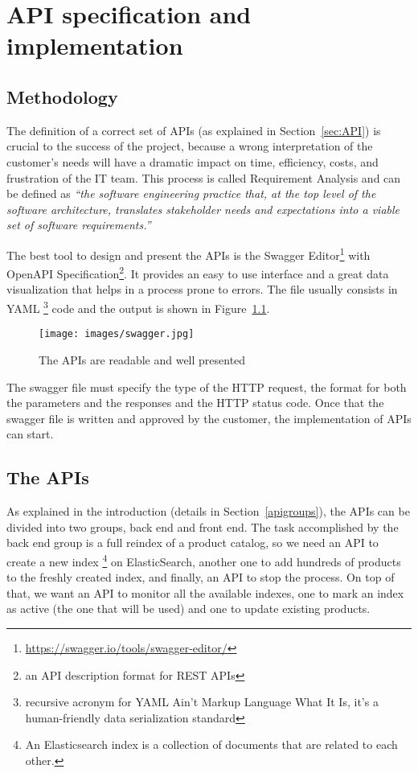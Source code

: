 \chapter{API specification and implementation}
\label{ch:spec}


\section{Methodology}
\label{sec:method}
The definition of a correct set of APIs (as explained in
Section~\ref{sec:API}) is crucial to the success of the project,
because a wrong interpretation of the customer's needs will have a
dramatic impact on time, efficiency, costs, and frustration of the IT
team.  This process is called Requirement Analysis and can be defined
as \textit{``the software engineering practice that, at the top level
  of the software architecture, translates stakeholder needs and
  expectations into a viable set of software
  requirements.''}\cite{schmidt2013software}

The best tool to design and present the APIs is the Swagger
Editor\footnote{ \url{https://swagger.io/tools/swagger-editor/} } with
OpenAPI Specification\footnote{an API description format for REST
  APIs}.  It provides an easy to use interface and a great data
visualization that helps in a process prone to errors.  The file
usually consists in YAML \footnote{recursive acronym for YAML Ain't
  Markup Language What It Is, it's a human-friendly data serialization
  standard} code and the output is shown in Figure~\ref{fig:swagger}.

\begin{figure}[h]
    \centering
    \texttt{[image: images/swagger.jpg]}
    \caption{The APIs are readable and well presented }
     \label{fig:swagger}
\end{figure}

The swagger file must specify the type of the HTTP request, the format for both the parameters and the responses and
the HTTP status code.
Once that the swagger file is written and approved by the customer, the implementation of APIs can start.




\section{The APIs}
As explained in the introduction (details in Section~\ref{apigroups}),
the APIs can be divided into two groups, back end and front end.
The task accomplished by the back end group is a full reindex of a product catalog,
so we need an API to create a new index
\footnote{An Elasticsearch index is a collection of documents that are related to each other.}
 on ElasticSearch, another one to add hundreds of products to the freshly created index,
 and finally, an API to stop the process. On top of that, we want an API to monitor all the available
 indexes, one to mark an index as active  (the one that will be used) and one to update existing products.

